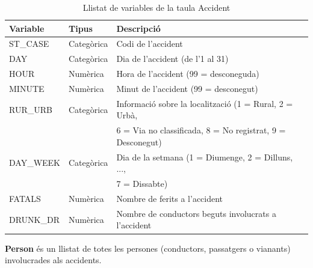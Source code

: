 \documentclass[11pt,longbibliography]{article}
\theoremstyle{definition}
\theoremstyle{remark}
\begin{document}
\begin{table}[H]
\centering
\begin{tabular}{|l|l|l|}
\hline
\textbf{Variable} & \textbf{Tipus} & \textbf{Descripció}                                  \\\hline
ST\_CASE          & Categòrica     & Codi de l’accident                                   \\
DAY               & Categòrica     & Dia de l’accident (de l’1 al 31)                     \\
HOUR              & Numèrica       & Hora de l’accident (99 = desconeguda)                \\
MINUTE            & Numèrica       & Minut de l’accident (99 = desconegut)                \\
RUR\_URB  & Categòrica & Informació sobre la localització (1 = Rural, 2 = Urbà,  \\
   &   & 6 = Via no classificada, 8 = No registrat, 9 = Desconegut) \\
DAY\_WEEK & Categòrica & Dia de la setmana (1 = Diumenge, 2 = Dilluns, ...,                                              \\
  &   &  7 = Dissabte)                                                  \\
FATALS            & Numèrica       & Nombre de ferits a l’accident                        \\
DRUNK\_DR          & Numèrica       & Nombre de conductors beguts involucrats a l’accident \\\hline
\end{tabular}
\caption{\label{accident-table}Llistat de variables de la taula Accident}
\end{table}

\textbf{Person} és un llistat de totes les persones (conductors, passatgers o vianants) involucrades als accidents.
\end{document}
